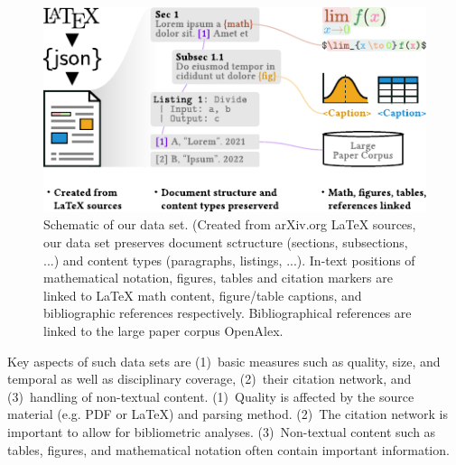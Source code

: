 \begin{figure}[tb]
  \centering
  \includegraphics[width=\linewidth]{figures/ref_covgran/schema}
  \caption[Schematic of our data set]{Schematic of our data set. (Created from arXiv.org \LaTeX{} sources, our data set preserves document sctructure (sections, subsections, ...) and content types (paragraphs, listings, ...). In-text positions of mathematical notation, figures, tables and citation markers are linked to \LaTeX{} math content, figure/table captions, and bibliographic references respectively. Bibliographical references are linked to the large paper corpus OpenAlex.}
  \label{fig:schema}
\end{figure}


Key aspects of such data sets are (1)~basic measures such as quality, size, and temporal as well as disciplinary coverage, (2)~their citation network, and (3)~handling of non-textual content. (1)~Quality is affected by the source material (e.g. PDF or \LaTeX{}) and parsing method. (2)~The citation network is important to allow for bibliometric analyses. (3)~Non-textual content such as tables, figures, and mathematical notation often contain important information.

